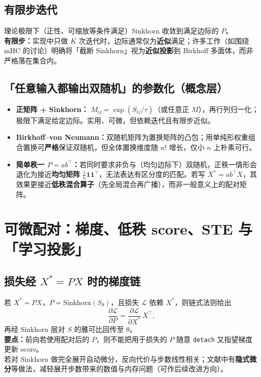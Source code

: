 \documentclass[UTF8]{ctexart}
\begin{document}
\subsection{有限步迭代}

理论极限下（正性、可缩放等条件满足）Sinkhorn 收敛到满足边际的 $P$。\\
\textbf{有限步：}实现中只做 $K$ 次迭代时，边际通常仅为\textbf{近似}满足；许多工作（如围绕 mHC 的讨论）明确将「截断 Sinkhorn」视为\textbf{近似投影}到 Birkhoff 多面体，而非严格落在集合内。

\subsection{「任意输入都输出双随机」的参数化（概念层）}

\begin{itemize}
  \item \textbf{正矩阵 + Sinkhorn：} $M_{ij}=\exp(S_{ij}/\tau)$（或任意正 $M$），再行列归一化；极限下满足给定边际。实用、可微，但依赖迭代且有限步近似。
  \item \textbf{Birkhoff--von Neumann：}双随机矩阵为置换矩阵的凸包；用单纯形权重组合置换可\textbf{严格}保证双随机，但全体置换维度随 $n!$ 增长，仅小 $n$ 上朴素可行。
  \item \textbf{简单秩一 $P=ab^\top$：}若同时要求非负与（均匀边际下）双随机，正秩一情形会退化为接近\textbf{均匀矩阵} $\frac1n\mathbf{11}^\top$，无法表达有区分度的匹配。若写 $X^\ast=ab^\top X$，其效果更接近\textbf{低秩混合算子}（先全局混合再广播），而非一般意义上的配对矩阵。
\end{itemize}

\section{可微配对：梯度、低秩 score、STE 与「学习投影」}

\subsection{损失经 $X^\ast=PX$ 时的梯度链}

若 $X^\ast=PX$，$P=\mathrm{Sinkhorn}(S_\theta)$，且损失 $\mathcal{L}$ 依赖 $X^\ast$，则链式法则给出
\[
\frac{\partial \mathcal{L}}{\partial P}=\frac{\partial \mathcal{L}}{\partial X^\ast}\,X^\top,
\]
再经 Sinkhorn 层对 $S$ 的雅可比回传至 $\theta$。\\
\textbf{要点：}前向若使用配对后的 $P$，则不能把用于损失的 $P$ 随意 \texttt{detach} 又指望梯度更新 score。\\
若对 Sinkhorn 做完全展开自动微分，反向代价与步数线性相关；文献中有\textbf{隐式微分}等做法，减轻展开步数带来的数值与内存问题（可作后续改进方向）。
\end{document}
